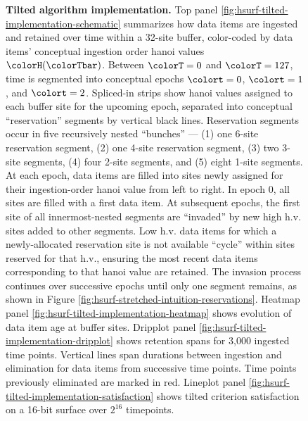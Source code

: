 \begin{figure}[htbp!]
\vspace{-2ex}\caption{%
  \textbf{Tilted algorithm implementation.}
  \footnotesize
  Top panel \ref{fig:hsurf-tilted-implementation-schematic} summarizes how data items are ingested and retained over time within a 32-site buffer, color-coded by data items' conceptual ingestion order hanoi values $\colorH(\colorTbar)$.
  Between $\colorT=0$ and $\colorT=127$, time is segmented into conceptual epochs $\colort=0$, $\colort=1$, and $\colort=2$.
  Spliced-in strips show hanoi values assigned to each buffer site for the upcoming epoch, separated into conceptual ``reservation'' segments by vertical black lines.
  Reservation segments occur in five recursively nested ``bunches'' --- (1) one 6-site reservation segment, (2) one 4-site reservation segment, (3) two 3-site segments, (4) four 2-site segments, and (5) eight 1-site segments.
  At each epoch, data items are filled into sites newly assigned for their ingestion-order hanoi value from left to right.
  In epoch 0, all sites are filled with a first data item.
  At subsequent epochs, the first site of all innermost-nested segments are ``invaded'' by new high h.v. sites added to other segments.
  Low h.v. data items for which a newly-allocated reservation site is not available ``cycle'' within sites reserved for that h.v., ensuring the most recent data items corresponding to that hanoi value are retained.
  The invasion process continues over successive epochs until only one segment remains, as shown in Figure \ref{fig:hsurf-stretched-intuition-reservations}.
  Heatmap panel \ref{fig:hsurf-tilted-implementation-heatmap} shows evolution of data item age at buffer sites.
  Dripplot panel \ref{fig:hsurf-tilted-implementation-dripplot} shows retention spans for 3,000 ingested time points.
  Vertical lines span durations between ingestion and elimination for data items from successive time points.
  Time points previously eliminated are marked in red.
  Lineplot panel \ref{fig:hsurf-tilted-implementation-satisfaction} shows tilted criterion satisfaction on a 16-bit surface over $2^{16}$ timepoints.
}
\label{fig:hsurf-tilted-implementation}

\end{figure}
